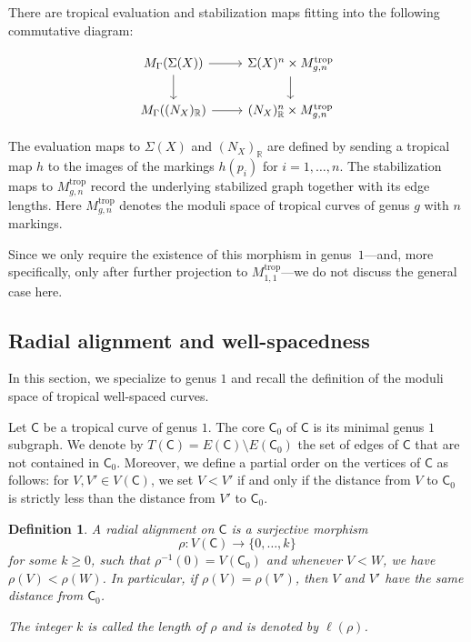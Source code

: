 \documentclass{article}
\newtheorem{definition}{Definition}[section]
\newcommand{\tropC}{\mathsf{C}}
\newcommand{\trop}{\operatorname{trop}}
\begin{document}
    
    
There are tropical evaluation and stabilization maps fitting into the following commutative diagram:

\begin{equation}\label{eqn: full tropical ev map}
    \begin{tikzcd}
        M_\Gamma(\Sigma(X)) 
        \arrow[r] 
        \arrow[d]                
        & \Sigma(X)^n \times M_{g,n}^{\trop}
        \arrow[d]      \\
        M_\Gamma((N_X)_{\mathbb{R}}) 
        \arrow[r] 
        & (N_X)_{\mathbb{R}}^n \times M_{g,n}^{\trop}
    \end{tikzcd}
\end{equation}

The evaluation maps to $\Sigma(X)$ and $(N_X)_{\mathbb{R}}$ are defined by sending a tropical map $h$ to the images of the markings $h(p_i)$ for $i = 1, \ldots, n$. The stabilization maps to $M_{g,n}^{\trop}$ record the underlying stabilized graph together with its edge lengths. Here $M_{g,n}^{\trop}$ denotes the moduli space of tropical curves of genus $g$ with $n$ markings. 

Since we only require the existence of this morphism in genus~$1$—and, more specifically, only after further projection to $M_{1,1}^{\trop}$—we do not discuss the general case here.
    


    \subsection{Radial alignment and well-spacedness}\label{sec: well-spaced tropical maps}

    In this section, we specialize to genus $1$ and recall the definition of the moduli space of tropical well-spaced curves.
    

Let $\mathsf{C}$ be a tropical curve of genus $1$. The core $\mathsf{C}_0$ of $\mathsf{C}$ is its minimal genus $1$ subgraph. We denote by $T(\mathsf{C}) = E(\mathsf{C}) \setminus E(\mathsf{C}_0)$ the set of edges of $\mathsf{C}$ that are not contained in $\mathsf{C}_0$. Moreover, we define a partial order on the vertices of $\mathsf{C}$ as follows: for $V, V' \in V(\mathsf{C})$, we set $V < V'$ if and only if the distance from $V$ to $\mathsf{C}_0$ is strictly less than the distance from $V'$ to $\mathsf{C}_0$.

\begin{definition}\label{def:radalign}
A radial alignment on $\mathsf{C}$ is a surjective morphism
\[
\rho \colon V(\mathsf{C}) \to \{0,\ldots,k\}
\]
for some $k \geq 0$, such that $\rho^{-1}(0) = V(\mathsf{C}_0)$ and whenever $V < W$, we have $\rho(V) < \rho(W)$. In particular, if $\rho(V)=\rho(V')$, then $V$ and $V'$ have the same distance from $\tropC_0$.

The integer $k$ is called the length of $\rho$ and is denoted by $\ell(\rho)$.
\end{definition}
\end{document}
